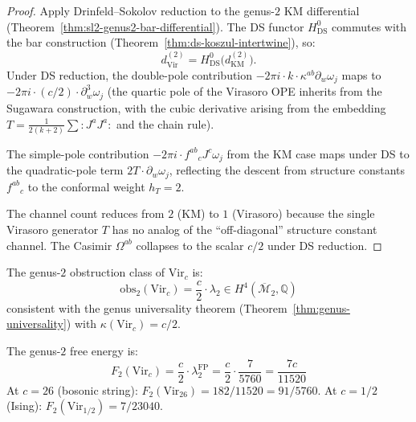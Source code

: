 \begin{proof}
Apply Drinfeld--Sokolov reduction to the genus-$2$ KM differential
(Theorem~\ref{thm:sl2-genus2-bar-differential}).  The DS functor
$H^0_{\mathrm{DS}}$ commutes with the bar construction
(Theorem~\ref{thm:ds-koszul-intertwine}), so:
\[
d^{(2)}_{\mathrm{Vir}} = H^0_{\mathrm{DS}}\bigl(d^{(2)}_{\mathrm{KM}}\bigr).
\]
Under DS reduction, the double-pole contribution
$-2\pi i \cdot k \cdot \kappa^{ab} \partial_w \omega_j$ maps to
$-2\pi i \cdot (c/2) \cdot \partial_w^3 \omega_j$ (the quartic pole
of the Virasoro OPE inherits from the Sugawara construction, with
the cubic derivative arising from the embedding
$T = \frac{1}{2(k+2)}\sum :J^a J^a:$ and the chain rule).

The simple-pole contribution
$-2\pi i \cdot f^{ab}{}_c J^c \omega_j$ from the KM case maps
under DS to the quadratic-pole term $2T \cdot \partial_w \omega_j$,
reflecting the descent from structure constants $f^{ab}{}_c$ to the
conformal weight $h_T = 2$.

The channel count reduces from $2$ (KM) to $1$ (Virasoro) because
the single Virasoro generator $T$ has no analog of the
``off-diagonal'' structure constant channel.  The Casimir
$\Omega^{ab}$ collapses to the scalar $c/2$ under DS reduction.
\end{proof}

\begin{corollary}
\label{cor:virasoro-genus2-curvature}
The genus-$2$ obstruction class of $\mathrm{Vir}_c$ is:
\begin{equation}\label{eq:vir-obs2}
\mathrm{obs}_2(\mathrm{Vir}_c) = \frac{c}{2} \cdot \lambda_2
\in H^4(\overline{\mathcal{M}}_2, \mathbb{Q})
\end{equation}
consistent with the genus universality theorem
\textup{(}Theorem~\textup{\ref{thm:genus-universality})} with
$\kappa(\mathrm{Vir}_c) = c/2$.

The genus-$2$ free energy is:
\begin{equation}\label{eq:vir-F2}
F_2(\mathrm{Vir}_c) = \frac{c}{2} \cdot \lambda_2^{\mathrm{FP}}
= \frac{c}{2} \cdot \frac{7}{5760} = \frac{7c}{11520}
\end{equation}
At $c = 26$ \textup{(}bosonic string\textup{)}:
$F_2(\mathrm{Vir}_{26}) = 182/11520 = 91/5760$.
At $c = 1/2$ \textup{(}Ising\textup{)}:
$F_2(\mathrm{Vir}_{1/2}) = 7/23040$.
\end{corollary}

